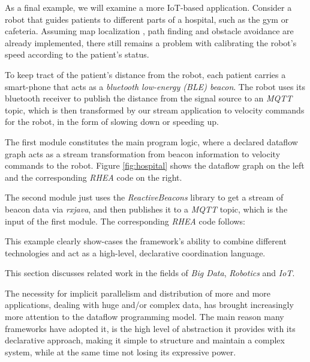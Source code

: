 \documentclass{dithesis}
\begin{document}

As a final example, we will examine a more IoT-based application. Consider a robot that guides patients to different parts of a hospital, such as the gym or cafeteria. Assuming map localization , path finding and obstacle avoidance are already implemented, there still remains a problem with calibrating the robot's speed according to the patient's status. 

To keep tract of the patient's distance from the robot, each patient carries a smart-phone that acts as a \textit{bluetooth low-energy (BLE) beacon}. The robot uses its bluetooth receiver to publish the distance from the signal source to an \textit{MQTT} topic, which is then transformed by our stream application to velocity commands for the robot, in the form of slowing down or speeding up.

The first module constitutes the main program logic, where a declared dataflow graph acts as a stream transformation from beacon information to velocity commands to the robot. Figure \ref{fig:hospital} shows the dataflow graph on the left and the corresponding \textit{RHEA} code on the right.


The second module just uses the \textit{ReactiveBeacons} library to get a stream of beacon data via \textit{rxjava}, and then publishes it to a \textit{MQTT} topic, which is the input of the first module. The corresponding \textit{RHEA} code follows:
\\

This example clearly show-cases the framework's ability to combine different technologies and act as a high-level, declarative coordination language.




This section discusses related work in the fields of \textit{Big Data}, \textit{Robotics} and \textit{IoT}.


The necessity for implicit parallelism and distribution of more and more applications, dealing with huge and/or complex data, has brought increasingly more attention to the dataflow programming model. The main reason many frameworks have adopted it, is the high level of abstraction it provides with its declarative approach, making it simple to structure and maintain a complex system, while at the same time not losing its expressive power.
\end{document}
